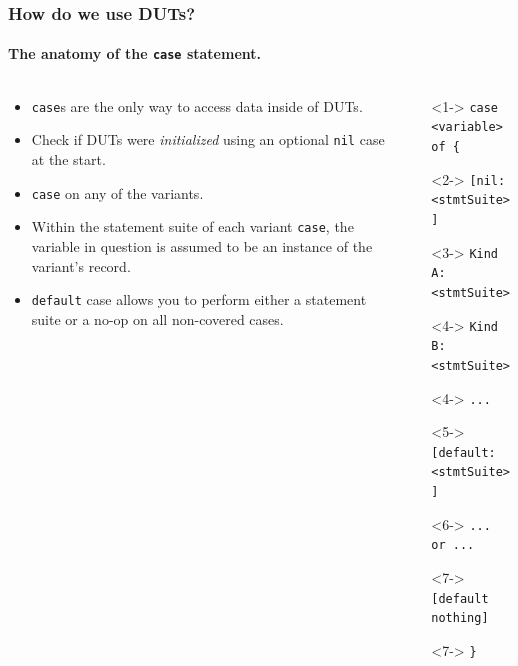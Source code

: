 \documentclass{beamer}
\begin{document}
\begin{frame}
 \frametitle{How do we use DUTs?}
 \framesubtitle{The anatomy of the \texttt{case} statement.}
    \begin{columns}[T,onlytextwidth]
        \begin{column}{.5\textwidth}
            \begin{minipage}{\textwidth}
                \begin{itemize}
                    \item<1-> \texttt{case}s are the only way to access data inside of DUTs.
                    \item<2-> Check if DUTs were \textit{initialized} using an optional \texttt{nil} case at the start.
                    \item<3-> \texttt{case} on any of the variants.
                    \item<4-> Within the statement suite of each variant \texttt{case}, the variable in question is assumed to be an instance of the variant's record.
                    \item<5-> \texttt{default} case allows you to perform either a statement suite or a no-op on all non-covered cases. 
                \end{itemize}
            \end{minipage}
        \end{column}
        \begin{column}{.45\textwidth}
            \begin{onlyenv}
                \begin{minipage}{\textwidth}
                    \setlength{\leftmargini}{0cm}
                    \begin{itemize}[label={},leftmargin=*]
                     \item[]<1-> \texttt{case <variable> of \{}
                     \item[]<2-> \hphantom{~~~~}\texttt{[nil: <stmtSuite>]}
                     \item[]<3-> \hphantom{~~~~}\texttt{Kind A: <stmtSuite>}
                     \item[]<4-> \hphantom{~~~~}\texttt{Kind B: <stmtSuite>}
                     \item[]<4-> \hphantom{~~~~}\texttt{...}
                     \item[]<5-> \hphantom{~~~~}\texttt{[default: <stmtSuite>]}
                     \item[]<6-> \hphantom{~~~~}\texttt{... or ...}
                     \item[]<7-> \hphantom{~~~~}\texttt{[default nothing]}
                     \item[]<7-> \texttt{\}}
                    \end{itemize}


\end{minipage}
\end{onlyenv}
\end{column}
\end{columns}
\end{frame}
\end{document}

